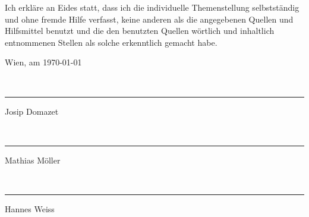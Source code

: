 
Ich erkläre an Eides statt, dass ich die individuelle Themenstellung
selbstständig und ohne fremde Hilfe verfasst, keine anderen als die
angegebenen Quellen und Hilfsmittel benutzt und die den benutzten
Quellen wörtlich und inhaltlich entnommenen Stellen als solche erkenntlich
gemacht habe.

\begin{flushleft}
\bigskip{}
Wien, am \today \\
\newcommand{\namesigdate}[2][8cm]{
\vspace{2cm}~\newline
\parbox{#1}{\hrule\centering #2\Large\strut}
\hfill
}
\namesigdate{Josip Domazet}
\namesigdate{Mathias Möller} 
\namesigdate{Hannes Weiss}
\par\end{flushleft}


